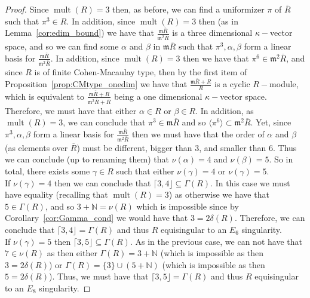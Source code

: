 \documentclass{article}
\DeclareMathOperator{\mult}{mult}
\numberwithin{theorem}{section}
\begin{document}
\begin{proof}
    Since $\mult(R)=3$ then, as before, we can find a uniformizer $\pi$ of $\overline{R}$ such that $\pi^3 \in R$. In addition, since $\mult(R)=3$ then (as in Lemma~\ref{cor:edim_bound}) we have that $\frac{\mathfrak{m}\overline{R}}{\mathfrak{m}^2 \overline{R}}$ is a three dimensional $\kappa-$vector space, and so we can find some $\alpha$ and $\beta$ in $\mathfrak{m}\overline{R}$ such that $\pi^3, \alpha, \beta$ form a linear basis for $\frac{\mathfrak{m}\overline{R}}{\mathfrak{m}^2 \overline{R}}$. In addition, since $\mult(R)=3$ then we have that $\pi^6 \in \mathfrak{m}^2 \overline{R}$, and since $R$ is of finite Cohen-Macaulay type, then by the first item of Proposition~\ref{prop:CMtype_onedim} we have that $\frac{\mathfrak{m}\overline{R}+R}{R}$ is a cyclic $R-$module, which is equivalent to $\frac{\mathfrak{m}\overline{R}+R}{\mathfrak{m}^2 \overline{R}+R}$ being a one dimensional $\kappa-$vector space. Therefore, we must have that either $\alpha \in R$ or $\beta \in R$. In addition, as $\mult(R)=3$, we can conclude that $\pi^3 \in \mathfrak{m} \overline{R}$ and so $\langle \pi^6 \rangle \subset \mathfrak{m}^2 \overline{R}$. Yet, since $\pi^3, \alpha, \beta$ form a linear basis for $\frac{\mathfrak{m}\overline{R}}{\mathfrak{m}^2 \overline{R}}$ then we must have that the order of $\alpha$ and $\beta$ (as elements over $\overline{R}$) must be different, bigger than $3$, and smaller than $6$. Thus we can conclude (up to renaming them) that $\nu(\alpha) =4$ and $\nu(\beta)=5$. So in total, there exists some $\gamma \in R$ such that either $\nu(\gamma)=4$ or $\nu(\gamma)=5$.\\
    
    If $\nu(\gamma)=4$ then we can conclude that $\lceil 3, 4 \rfloor \subseteq \Gamma(R)$. In this case we must have equality (recalling that $\mult(R)=3$) as otherwise we have that $5 \in \Gamma(R)$, and so $3+\mathbb{N} = \nu(R)$ which is impossible since by Corollary~\ref{cor:Gamma_cond} we would have that $3=2\delta(R)$. Therefore, we can conclude that $\lceil 3, 4 \rfloor = \Gamma(R)$  and thus $R$ equisingular to an $E_6$ singularity. \\
    
    If $\nu(\gamma)=5$ then $\lceil 3, 5 \rfloor \subseteq \Gamma(R)$. As in the previous case, we can not have that $7 \in \nu(R)$ as then either $\Gamma(R)=3+\mathbb{N}$ (which is impossible as then $3=2\delta(R)$) or $\Gamma(R) = \{3\} \cup (5+\mathbb{N})$ (which is impossible as then $5=2\delta(R)$). Thus, we must have that $\lceil 3, 5 \rfloor = \Gamma(R)$  and thus $R$ equisingular to an $E_8$ singularity.
\end{proof}
\end{document}
